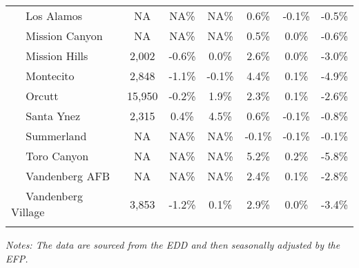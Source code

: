 \documentclass[12pt]{article}
\begin{document}
\begin{landscape}
\begin{table}
\begin{tabular}{|l|c|c|c||c|c|c|}
$\quad$ Los Alamos & NA & NA\% & NA\% & 0.6\% & -0.1\% & -0.5\% \\
$\quad$ Mission Canyon & NA & NA\% & NA\% & 0.5\% & 0.0\% & -0.6\% \\
$\quad$ Mission Hills & 2,002 & -0.6\% & 0.0\% & 2.6\% & 0.0\% & -3.0\% \\
$\quad$ Montecito & 2,848 & -1.1\% & -0.1\% & 4.4\% & 0.1\% & -4.9\% \\
$\quad$ Orcutt & 15,950 & -0.2\% & 1.9\% & 2.3\% & 0.1\% & -2.6\% \\
$\quad$ Santa Ynez & 2,315 & 0.4\% & 4.5\% & 0.6\% & -0.1\% & -0.8\% \\
$\quad$ Summerland & NA & NA\% & NA\% & -0.1\% & -0.1\% & -0.1\% \\
$\quad$ Toro Canyon & NA & NA\% & NA\% & 5.2\% & 0.2\% & -5.8\% \\
$\quad$ Vandenberg AFB & NA & NA\% & NA\% & 2.4\% & 0.1\% & -2.8\% \\
$\quad$ Vandenberg Village & 3,853 & -1.2\% & 0.1\% & 2.9\% & 0.0\% & -3.4\% \\
&&&&&& \\ \hline \hline
\end{tabular}
\par
\vspace{.5em}
\footnotesize
\textit{Notes: The data are sourced from the EDD and then seasonally adjusted by the EFP.}
\end{table}
\end{landscape}
\end{document}
